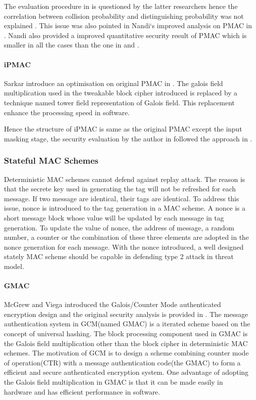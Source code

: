 \documentclass{article}
\begin{document}
The evaluation procedure in \cite{pmac} is questioned by the latter researchers hence the correlation between collision probability and 
distinguishing probability was not explained . This issue was also pointed in Nandi`s improved analysis on PMAC in \cite{improve_pmac}. Nandi also provided a improved quantitative security result of PMAC which is smaller in all the cases than the one in \cite{pmac} and \cite{new}. 
\paragraph{iPMAC}
Sarkar introduce an optimisation on original PMAC in \cite{iPMAC}. The galois field multiplication used in the tweakable block cipher introduced is replaced by a technique named tower field representation of Galois field. This replacement enhance the processing speed in software.

Hence the structure of iPMAC is same as the original PMAC except the input masking stage, the security evaluation by the author in \cite{iPMAC} followed the approach in \cite{pmac}.

\subsubsection{Stateful MAC Schemes}
Deterministic MAC schemes cannot defend against replay attack. The reason is that the secrete key used in generating the tag will not be refreshed for each message. If two message are identical, their tags are identical. To address this issue, nonce is introduced to the tag generation in a MAC scheme. A nonce is a short message block whose value will be updated by each message in tag generation. To update the value of nonce, the address of message, a random number, a counter or the combination of these three elements are adopted in the nonce generation for each message. With the nonce introduced, a well designed stately MAC scheme should be capable in defending type 2 attack in threat model.
\paragraph{GMAC}
McGrew and Viega introduced the Galois/Counter Mode authenticated encryption design and the original security analysis is provided in \cite{gcm}. The message authentication system in GCM(named GMAC) is a iterated scheme based on the concept of universal hashing. The block processing component used in GMAC is the Galois field multiplication other than the block cipher in deterministic MAC schemes. 
The motivation of GCM is to design a scheme combining counter mode of operation(CTR) with a message authentication code(the GMAC) to form a efficient and secure authenticated encryption system.
One advantage of adopting the Galois field multiplication in GMAC is that it can be made easily in hardware and has efficient performance in software. 
\end{document}
